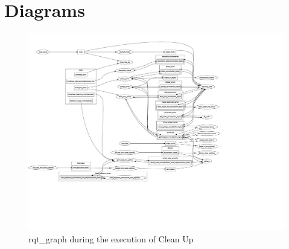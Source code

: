 \documentclass[main.tex]{subfiles}
\begin{document}
		\section{Diagrams}
		\begin{figure}[H]
			\centering
			\includegraphics[width=1.5\textwidth]{pictures/diagramms/rqt_interfaces_cleanup_vertical}
			\caption{rqt\_graph during the execution of Clean Up}
			\label{interfaces}
		\end{figure}
		\endgroup
\end{document}

